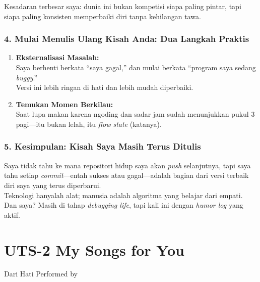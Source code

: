 \documentclass[
  letterpaper,
  DIV=11,
  numbers=noendperiod]{scrreprt}
\begin{document}
Kesadaran terbesar saya: dunia ini bukan kompetisi siapa paling pintar,
tapi siapa paling konsisten memperbaiki diri tanpa kehilangan tawa.

\subsection{\texorpdfstring{\textbf{4. Mulai Menulis Ulang Kisah Anda:
Dua Langkah
Praktis}}{4. Mulai Menulis Ulang Kisah Anda: Dua Langkah Praktis}}\label{mulai-menulis-ulang-kisah-anda-dua-langkah-praktis}

\begin{enumerate}
\def\labelenumi{\arabic{enumi}.}
\item
  \textbf{Eksternalisasi Masalah:}\\
  Saya berhenti berkata ``saya gagal,'' dan mulai berkata ``program saya
  sedang \emph{buggy}.''\\
  Versi ini lebih ringan di hati dan lebih mudah diperbaiki.
\item
  \textbf{Temukan Momen Berkilau:}\\
  Saat lupa makan karena ngoding dan sadar jam sudah menunjukkan pukul 3
  pagi---itu bukan lelah, itu \emph{flow state} (katanya).
\end{enumerate}

\subsection{\texorpdfstring{\textbf{5. Kesimpulan: Kisah Saya Masih
Terus
Ditulis}}{5. Kesimpulan: Kisah Saya Masih Terus Ditulis}}\label{kesimpulan-kisah-saya-masih-terus-ditulis}

Saya tidak tahu ke mana repositori hidup saya akan \emph{push}
selanjutnya, tapi saya tahu setiap \emph{commit}---entah sukses atau
gagal---adalah bagian dari versi terbaik diri saya yang terus
diperbarui.\\
Teknologi hanyalah alat; manusia adalah algoritma yang belajar dari
empati.\\
Dan saya? Masih di tahap \emph{debugging life}, tapi kali ini dengan
\emph{humor log} yang aktif.


\chapter{UTS-2 My Songs for You}\label{uts-2-my-songs-for-you}

Dari Hati Performed by
\end{document}
